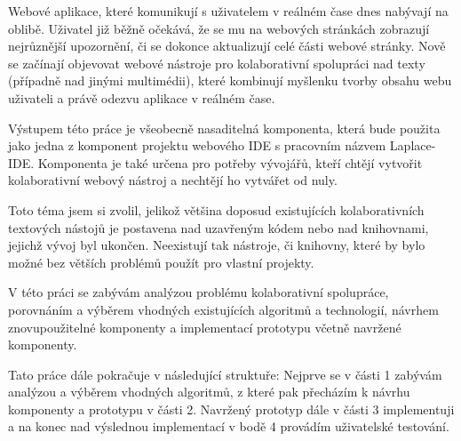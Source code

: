 
Webové aplikace, které komunikují s uživatelem v reálném čase dnes nabývají na oblibě.
Uživatel již běžně očekává, že se mu na webových stránkách zobrazují nejrůznější upozornění, či se dokonce aktualizují celé části webové stránky.
Nově se začínají objevovat webové nástroje pro kolaborativní spolupráci nad texty (případně nad jinými multimédii), které kombinují myšlenku tvorby obsahu webu uživateli a právě odezvu aplikace v reálném čase.

Výstupem této práce je všeobecně nasaditelná komponenta, která bude použita jako jedna z komponent projektu webového IDE s pracovním názvem Laplace-IDE.
Komponenta je také určena pro potřeby vývojářů, kteří chtějí vytvořit kolaborativní webový nástroj a nechtějí ho vytvářet od nuly.

Toto téma jsem si zvolil, jelikož většina doposud existujících kolaborativních textových nástojů je postavena nad uzavřeným kódem nebo nad knihovnami, jejichž vývoj byl ukončen.
Neexistují tak nástroje, či knihovny, které by bylo možné bez větších problémů použít pro vlastní projekty.

V této práci se zabývám analýzou problému kolaborativní spolupráce, porovnáním a výběrem vhodných existujících algoritmů a technologií, návrhem znovupoužitelné komponenty a implementací prototypu včetně navržené komponenty.

Tato práce dále pokračuje v následující struktuře:
Nejprve se v části 1 zabývám analýzou a výběrem vhodných algoritmů, z které pak přecházím k návrhu komponenty a prototypu v části 2.
Navržený prototyp dále v části 3 implementuji a na konec nad výslednou implementací v bodě 4 provádím uživatelské testování.
